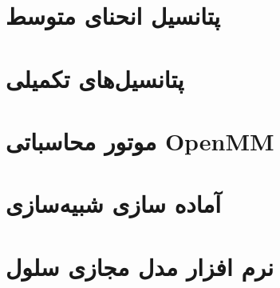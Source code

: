 \section{\label{sec:curvatureD}
پتانسیل انحنای متوسط
}



\section{
پتانسیل‌های تکمیلی
\label{sec:auxPotentials}
}




\section{
موتور محاسباتی
OpenMM
}


\section{
آماده سازی شبیه‌سازی
}


\section{
نرم افزار مدل مجازی سلول
}




